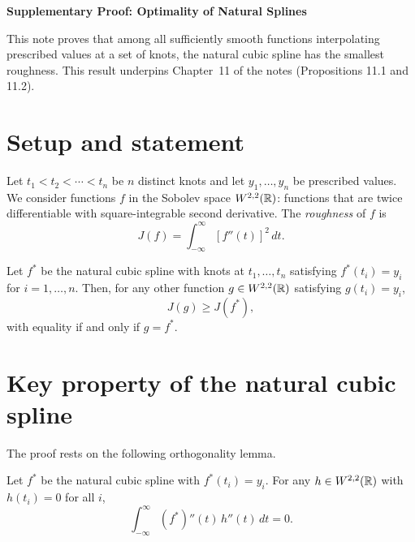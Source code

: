 



\moduleheader

\begin{center}
  {\Large\bfseries Supplementary Proof: Optimality of Natural Splines}
\end{center}

\bigskip

\noindent This note proves that among all sufficiently smooth functions
interpolating prescribed values at a set of knots, the natural cubic
spline has the smallest roughness.  This result underpins Chapter~11
of the notes (Propositions 11.1 and 11.2).

\section*{Setup and statement}

Let $t_1 < t_2 < \cdots < t_n$ be $n$ distinct knots and let
$y_1,\dots,y_n$ be prescribed values.  We consider functions $f$ in
the Sobolev space $W^{2,2}(\mathbb{R})$: functions that are twice
differentiable with square-integrable second derivative.  The
\emph{roughness} of $f$ is
\[
  J(f) = \int_{-\infty}^{\infty} [f''(t)]^2\,dt.
\]

\begin{theorem}
\label{thm:optimality}
  Let $f^*$ be the natural cubic spline with knots at $t_1,\dots,t_n$
  satisfying $f^*(t_i) = y_i$ for $i=1,\dots,n$.  Then, for any other
  function $g \in W^{2,2}(\mathbb{R})$ satisfying $g(t_i)=y_i$,
  \[
    J(g) \geq J(f^*),
  \]
  with equality if and only if $g = f^*$.
\end{theorem}

\section*{Key property of the natural cubic spline}

The proof rests on the following orthogonality lemma.

\begin{lemma}
\label{lem:orthog}
  Let $f^*$ be the natural cubic spline with $f^*(t_i)=y_i$.  For any
  $h\in W^{2,2}(\mathbb{R})$ with $h(t_i) = 0$ for all $i$,
  \[
    \int_{-\infty}^{\infty} (f^*)''(t)\,h''(t)\,dt = 0.
  \]
\end{lemma}

